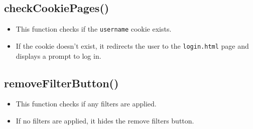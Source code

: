 \documentclass[12pt,a4paper]{article}
\begin{document}
\subsection{checkCookiePages()}
\begin{itemize}
    \item This function checks if the \texttt{username} cookie exists.
    \item If the cookie doesn't exist, it redirects the user to the \texttt{login.html} page and displays a prompt to log in.
\end{itemize}

\subsection{removeFilterButton()}
\begin{itemize}
    \item This function checks if any filters are applied.
    \item If no filters are applied, it hides the remove filters button.
\end{itemize}






% 
% 
% 
% 
% 
\end{document}
